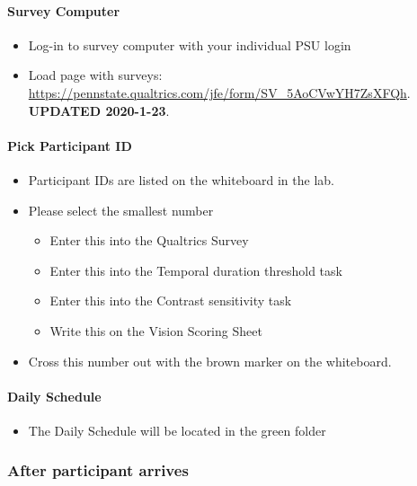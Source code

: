 \documentclass[]{article}
\providecommand{\tightlist}{%
  \setlength{\itemsep}{0pt}\setlength{\parskip}{0pt}}
\let\oldparagraph\paragraph
\renewcommand{\paragraph}[1]{\oldparagraph{#1}\mbox{}}
\begin{document}
\hypertarget{survey-computer}{%
\paragraph{Survey Computer}\label{survey-computer}}

\begin{itemize}
\tightlist
\item
  Log-in to survey computer with your individual PSU login
\item
  Load page with surveys:
  \url{https://pennstate.qualtrics.com/jfe/form/SV_5AoCVwYH7ZsXFQh}.
  \textbf{UPDATED 2020-1-23}.
\end{itemize}

\hypertarget{pick-participant-id}{%
\paragraph{Pick Participant ID}\label{pick-participant-id}}

\begin{itemize}
\tightlist
\item
  Participant IDs are listed on the whiteboard in the lab.
\item
  Please select the smallest number

  \begin{itemize}
  \tightlist
  \item
    Enter this into the Qualtrics Survey
  \item
    Enter this into the Temporal duration threshold task
  \item
    Enter this into the Contrast sensitivity task
  \item
    Write this on the Vision Scoring Sheet
  \end{itemize}
\item
  Cross this number out with the brown marker on the whiteboard.
\end{itemize}

\hypertarget{daily-schedule}{%
\paragraph{Daily Schedule}\label{daily-schedule}}

\begin{itemize}
\tightlist
\item
  The Daily Schedule will be located in the green folder
\end{itemize}

\hypertarget{after-participant-arrives}{%
\subsubsection{After participant
arrives}\label{after-participant-arrives}}
\end{document}
